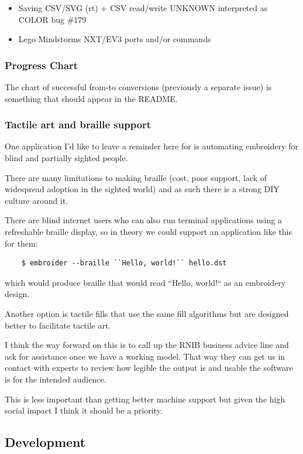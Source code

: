 \documentclass[a4paper, 11pt]{report}
\begin{document}
\begin{itemize}
\item Saving CSV/SVG (rt) + CSV read/write UNKNOWN interpreted as COLOR bug \#179
\item Lego Mindstorms NXT/EV3 ports and/or commands
\end{itemize}

\subsubsection{Progress Chart}

The chart of successful from-to conversions (previously a separate issue)
is something that should appear in the README.

\subsubsection{Tactile art and braille support}

One application I'd like to leave a reminder here for is automating embroidery
for blind and partially sighted people.

There are many limitations to making braille (cost, poor support, lack of
widespread adoption in the sighted world) and as such there is a strong DIY
culture around it.

There are blind internet users who can also run terminal applications using a
refreshable braille display, so in theory we could support an application like
this for them:

\begin{verbatim}
    $ embroider --braille ``Hello, world!`` hello.dst
\end{verbatim}

which would produce braille that would read ``Hello, world!`` as an embroidery
design.

Another option is tactile fills that use the same fill algorithms but are
designed better to facilitate tactile art.

I think the way forward on this is to call up the RNIB business advice line and
ask for assistance once we have a working model. That way they can get us in
contact with experts to review how legible the output is and usable the
software is for the intended audience.

This is less important than getting better machine support but given the high
social impact I think it should be a priority.

\subsection{Development}
\end{document}
